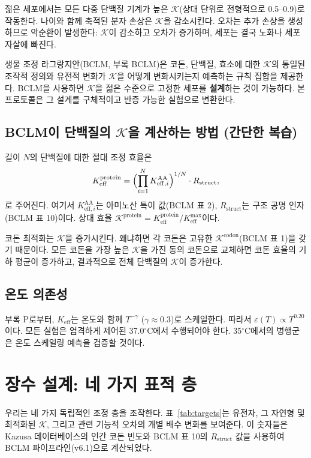 \documentclass[12pt,a4paper]{article}
\newcommand{\REL}{\mathcal{K}}          %
\begin{document}
	젊은 세포에서는 모든 다중 단백질 기계가 높은 \(\REL\)(상대 단위로 전형적으로 0.5–0.9)로 작동한다. 나이와 함께 축적된 분자 손상은 \(\REL\)을 감소시킨다. 오차는 추가 손상을 생성하므로 악순환이 발생한다: \(\REL\)이 감소하고 오차가 증가하며, 세포는 결국 노화나 세포자살에 빠진다.
	
	생물 조정 라그랑지안(BCLM, 부록 BCLM)은 코돈, 단백질, 효소에 대한 \(\REL\)의 통일된 조작적 정의와 유전적 변화가 \(\REL\)을 어떻게 변화시키는지 예측하는 규칙 집합을 제공한다. BCLM을 사용하면 \(\REL\)을 젊은 수준으로 고정한 세포를 \textbf{설계}하는 것이 가능하다. 본 프로토콜은 그 설계를 구체적이고 반증 가능한 실험으로 변환한다.
	
	\subsection{BCLM이 단백질의 \(\REL\)을 계산하는 방법 (간단한 복습)}
	길이 \(N\)의 단백질에 대한 절대 조정 효율은
	\[
	K_{\mathrm{eff}}^{\mathrm{protein}} = \Bigl( \prod_{i=1}^{N} K_{\mathrm{eff},i}^{\mathrm{AA}} \Bigr)^{1/N} \cdot R_{\mathrm{struct}},
	\]
	로 주어진다. 여기서 \(K_{\mathrm{eff},i}^{\mathrm{AA}}\)는 아미노산 특이 값(BCLM 표 2), \(R_{\mathrm{struct}}\)는 구조 공명 인자(BCLM 표 10)이다. 상대 효율 \(\REL^{\mathrm{protein}} = K_{\mathrm{eff}}^{\mathrm{protein}}/K_{\mathrm{eff}}^{\max}\)이다.
	
	코돈 최적화는 \(\REL\)을 증가시킨다. 왜냐하면 각 코돈은 고유한 \(\REL^{\mathrm{codon}}\)(BCLM 표 1)을 갖기 때문이다. 모든 코돈을 가장 높은 \(\REL\)을 가진 동의 코돈으로 교체하면 코돈 효율의 기하 평균이 증가하고, 결과적으로 전체 단백질의 \(\REL\)이 증가한다.
	
	\subsection{온도 의존성}
	부록 P로부터, \(K_{\mathrm{eff}}\)는 온도와 함께 \(T^{-\gamma}\) (\(\gamma\approx0.3\))로 스케일한다. 따라서 \(\varepsilon(T) \propto T^{0.20}\)이다. 모든 실험은 엄격하게 제어된 37.0\(^\circ\)C에서 수행되어야 한다. 35\(^\circ\)C에서의 병행군은 온도 스케일링 예측을 검증할 것이다.
	
	\section{장수 설계: 네 가지 표적 층}
	\label{sec:layers}
	우리는 네 가지 독립적인 조정 층을 조작한다. 표~\ref{tab:targets}는 유전자, 그 자연형 및 최적화된 \(\REL\), 그리고 관련 기능적 오차의 개별 배수 변화를 보여준다. 이 숫자들은 Kazusa 데이터베이스의 인간 코돈 빈도와 BCLM 표 10의 \(R_{\mathrm{struct}}\) 값을 사용하여 BCLM 파이프라인(v6.1)으로 계산되었다.
	
\end{document}
